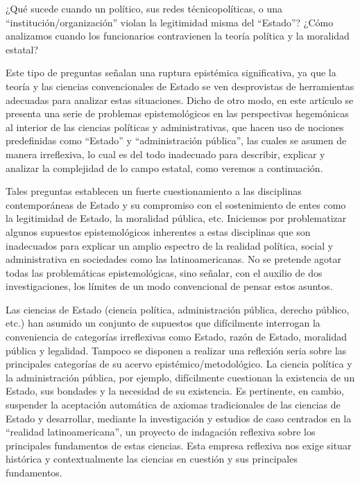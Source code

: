 \documentclass[
  spanish,
  11pt,
  a4paper,
]{scrbook}
\begin{document}

¿Qué sucede cuando un político, sus redes técnicopolíticas, o una
``institución/organización'' violan la legitimidad misma del ``Estado''?
¿Cómo analizamos cuando los funcionarios contravienen la teoría política
y la moralidad estatal?

Este tipo de preguntas señalan una ruptura epistémica significativa, ya
que la teoría y las ciencias convencionales de Estado se ven
desprovistas de herramientas adecuadas para analizar estas situaciones.
Dicho de otro modo, en este artículo se presenta una serie de problemas
epistemológicos en las perspectivas hegemónicas al interior de las
ciencias políticas y administrativas, que hacen uso de nociones
predefinidas como ``Estado'' y ``administración pública'', las cuales se
asumen de manera irreflexiva, lo cual es del todo inadecuado para
describir, explicar y analizar la complejidad de lo campo estatal, como
veremos a continuación.

Tales preguntas establecen un fuerte cuestionamiento a las disciplinas
contemporáneas de Estado y su compromiso con el sostenimiento de entes
como la legitimidad de Estado, la moralidad pública, etc. Iniciemos por
problematizar algunos supuestos epistemológicos inherentes a estas
disciplinas que son inadecuados para explicar un amplio espectro de la
realidad política, social y administrativa en sociedades como las
latinoamericanas. No se pretende agotar todas las problemáticas
epistemológicas, sino señalar, con el auxilio de dos investigaciones,
los límites de un modo convencional de pensar estos asuntos.

Las ciencias de Estado (ciencia política, administración pública,
derecho público, etc.) han asumido un conjunto de supuestos que
difícilmente interrogan la conveniencia de categorías irreflexivas como
Estado, razón de Estado, moralidad pública y legalidad. Tampoco se
disponen a realizar una reflexión seria sobre las principales categorías
de su acervo epistémico/metodológico. La ciencia política y la
administración pública, por ejemplo, difícilmente cuestionan la
existencia de un Estado, sus bondades y la necesidad de su existencia.
Es pertinente, en cambio, suspender la aceptación automática de axiomas
tradicionales de las ciencias de Estado y desarrollar, mediante la
investigación y estudios de caso centrados en la ``realidad
latinoamericana'', un proyecto de indagación reflexiva sobre los
principales fundamentos de estas ciencias. Esta empresa reflexiva nos
exige situar histórica y contextualmente las ciencias en cuestión y sus
principales fundamentos.
\end{document}
